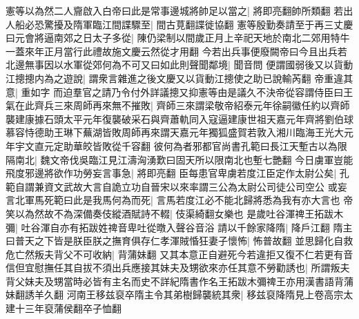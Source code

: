 憲等以為然二人齎啟入白帝曰此是常事邊城將帥足以當之|{
	將即亮翻帥所類翻}
若出人船必恐驚擾及隋軍臨江間諜驟至|{
	間古莧翻諜徙協翻}
憲等殷勤奏請至于再三丈慶曰元會將逼南郊之日太子多從|{
	陳仍梁制以間歲正月上辛祀天地於南北二郊用特牛一蓋來年正月當行此禮故施文慶云然從才用翻}
今若出兵事便廢闕帝曰今且出兵若北邊無事因以水軍從郊何為不可又曰如此則聲聞鄰境|{
	聞音問}
便謂國弱後又以貨動江摠摠内為之遊說|{
	謂衆言雜進之後文慶又以貨動江摠使之助已說輸芮翻}
帝重違其意|{
	重如字}
而迫羣官之請乃令付外詳議摠又抑憲等由是議久不決帝從容謂侍臣曰王氣在此齊兵三來周師再來無不摧敗|{
	齊師三來謂梁敬帝紹泰元年徐嗣徽任約以齊師襲建康據石頭太平元年復襲破采石與齊蕭軌同入寇逼建康世祖天嘉元年齊將劉伯球慕容恃德助王琳下蕪湖皆敗周師再來謂天嘉元年獨狐盛賀若敦入湘川臨海王光大元年宇文直元定助華皎皆敗從千容翻}
彼何為者邪都官尚書孔範曰長江天塹古以為限隔南北|{
	魏文帝伐吳臨江見江濤洶湧歎曰固天所以限南北也塹七艷翻}
今日虜軍豈能飛度邪邊將欲作功勞妄言事急|{
	將即亮翻}
臣每患官卑虜若度江臣定作太尉公矣|{
	孔範自謂兼資文武故大言自詭立功自晉宋以來率謂三公為太尉公司徒公司空公}
或妄言北軍馬死範曰此是我馬何為而死|{
	言馬若度江必不能北歸將悉為我有亦大言也}
帝笑以為然故不為深備奏伎縱酒賦詩不輟|{
	伎渠綺翻女樂也}
是歲吐谷渾禆王拓跋木彌|{
	吐谷渾自亦有拓跋姓禆音卑吐從暾入聲谷音浴}
請以千餘家降隋|{
	降戶江翻}
隋主曰普天之下皆是朕臣朕之撫育俱存仁孝渾賊惛狂妻子懷怖|{
	怖普故翻}
並思歸化自救危亡然叛夫背父不可收納|{
	背蒲妹翻}
又其本意正自避死今若違拒又復不仁若更有音信但宜慰撫任其自拔不須出兵應接其妹夫及甥欲來亦任其意不勞勸誘也|{
	所謂叛夫背父妹夫及甥當時必皆有主名而史不詳紀隋書作名王拓跋木彌禆王亦用漢書語背蒲妹翻誘羊久翻}
河南王移兹裒卒隋主令其弟樹歸襲統其衆|{
	移兹裒降隋見上卷高宗太建十三年裒蒲侯翻卒子恤翻}


